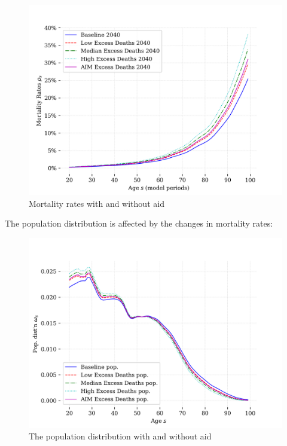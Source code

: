 \documentclass[letterpaper,12pt]{article}
\theoremstyle{definition}
\begin{document}
\begin{spacing}{1.5}
\begin{figure}[H]
    \caption{Mortality rates with and without aid}
    \centering
    \includegraphics[scale=0.75]{./tables_figures/mortality_rates.png}
\end{figure}


The population distribution is affected by the changes in mortality rates:
\begin{figure}[H]
    \caption{The population distribution with and without aid}
    \centering
    \includegraphics[scale=0.75]{./tables_figures/pop_dist_2050.png}
\end{figure}


\end{spacing}
\end{document}
